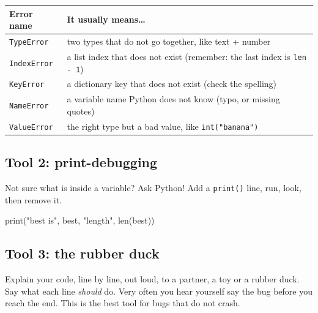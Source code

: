 \begin{center}
\renewcommand{\arraystretch}{1.3}
\begin{tabularx}{\linewidth}{@{}lX@{}}
\toprule
\textbf{Error name} & \textbf{It usually means\ldots} \\ \midrule
\texttt{TypeError} & two types that do not go together, like text + number \\
\texttt{IndexError} & a list index that does not exist (remember: the last index is \texttt{len - 1}) \\
\texttt{KeyError} & a dictionary key that does not exist (check the spelling) \\
\texttt{NameError} & a variable name Python does not know (typo, or missing quotes) \\
\texttt{ValueError} & the right type but a bad value, like \texttt{int("banana")} \\ \bottomrule
\end{tabularx}
\end{center}

\subsection{Tool 2: print-debugging}
Not sure what is inside a variable? Ask Python! Add a \texttt{print()} line, run, look, then remove it.
\begin{pycode}
print("best is", best, "length", len(best))
\end{pycode}

\subsection{Tool 3: the rubber duck}
Explain your code, line by line, out loud, to a partner, a toy or a rubber duck. Say what each line \emph{should} do.
Very often you hear yourself say the bug before you reach the end. This is the best tool for bugs that do not crash.

